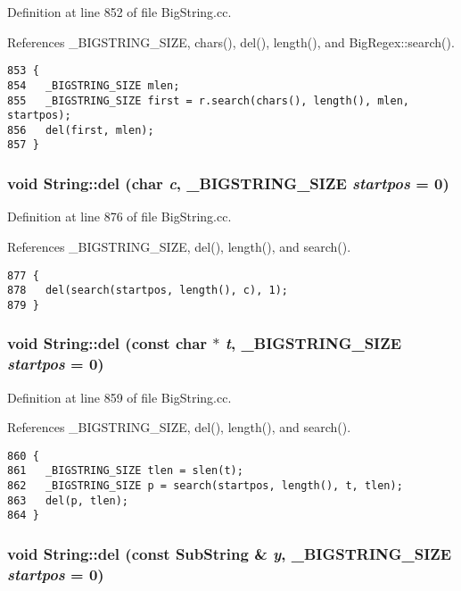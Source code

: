 Definition at line 852 of file Big\-String.cc.

References \_\-BIGSTRING\_\-SIZE, chars(), del(), length(), and Big\-Regex::search().



\footnotesize\begin{verbatim}853 {
854   _BIGSTRING_SIZE mlen;
855   _BIGSTRING_SIZE first = r.search(chars(), length(), mlen, startpos);
856   del(first, mlen);
857 }
\end{verbatim}\normalsize 
{}
\subsubsection{\setlength{\rightskip}{0pt plus 5cm}void String::del (char {\em c}, {\bf \_\-BIGSTRING\_\-SIZE} {\em startpos} = 0)}\label{classString_a87}




Definition at line 876 of file Big\-String.cc.

References \_\-BIGSTRING\_\-SIZE, del(), length(), and search().



\footnotesize\begin{verbatim}877 {
878   del(search(startpos, length(), c), 1);
879 }
\end{verbatim}\normalsize 
{}
\subsubsection{\setlength{\rightskip}{0pt plus 5cm}void String::del (const char $\ast$ {\em t}, {\bf \_\-BIGSTRING\_\-SIZE} {\em startpos} = 0)}\label{classString_a86}




Definition at line 859 of file Big\-String.cc.

References \_\-BIGSTRING\_\-SIZE, del(), length(), and search().



\footnotesize\begin{verbatim}860 {
861   _BIGSTRING_SIZE tlen = slen(t);
862   _BIGSTRING_SIZE p = search(startpos, length(), t, tlen);
863   del(p, tlen);
864 }
\end{verbatim}\normalsize 
{}
\subsubsection{\setlength{\rightskip}{0pt plus 5cm}void String::del (const {\bf Sub\-String} \& {\em y}, {\bf \_\-BIGSTRING\_\-SIZE} {\em startpos} = 0)}\label{classString_a85}




